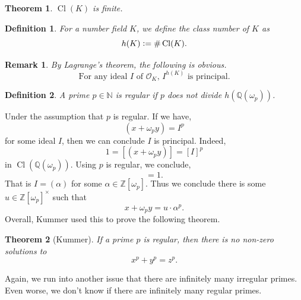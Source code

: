 \documentclass[10pt]{article}
\newtheorem{theorem}{Theorem} [section]
\newtheorem{definition}{Definition}[section]
\newtheorem{remark}{Remark}[section]
\DeclareMathOperator{\Cl}{Cl}
\newcommand{\defeq}{\vcentcolon=}
\newcommand{\N}[0]{\mathbb{N}}
\newcommand{\Z}[0]{\mathbb{Z}}
\newcommand{\Q}[0]{\mathbb{Q}}
\begin{document}
\begin{theorem}
    $\Cl(K)$ is finite.
\end{theorem}
\begin{definition}
    For a number field $K$, we define the class number of $K$ as
    \begin{equation*}
        h(K)\defeq\#\Cl(K).
    \end{equation*}
\end{definition}
\begin{remark}
    By Lagrange's theorem, the following is obvious.
    \begin{equation*}
        \text{For any ideal $I$ of $\mathcal{O}_K$, $I^{h(K)}$ is principal.}
    \end{equation*}
\end{remark}
\begin{definition}
    A prime $p\in\N$ is regular if $p$ does not divide $h(\Q(\omega_p))$.
\end{definition}
Under the assumption that $p$ is regular. If we have,
\begin{equation*}
    (x+\omega_py)=I^p
\end{equation*}
for some ideal $I$, then we can conclude $I$ is principal. Indeed,
\begin{equation*}
    1=[(x+\omega_py)]=[I]^p
\end{equation*}
in $\Cl(\Q(\omega_p))$. Using $p$ is regular, we conclude,
\begin{equation*}
    [I] = 1.
\end{equation*}
That is $I=(\alpha)$ for some $\alpha\in\Z[\omega_p]$. Thus we conclude there is some $u\in\Z[\omega_p]^\times$ such that 
\begin{equation*}
    x+\omega_py = u\cdot\alpha^p.
\end{equation*}
Overall, Kummer used this to prove the following theorem.
\begin{theorem}[Kummer]
    If a prime $p$ is regular, then there is no non-zero solutions to 
    \begin{equation*}
        x^p+y^p=z^p.
    \end{equation*}
\end{theorem}

Again, we run into another issue that there are infinitely many irregular primes. Even worse, we don't know if there are infinitely many regular primes.
\end{document}

